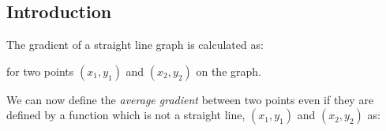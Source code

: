             \subsection{ Introduction}
            \nopagebreak
      \label{m39213*id189263}The gradient of a straight line graph is calculated as:\par 
      \label{m39213*uid1}\nopagebreak\noindent{}
      \label{m39213*id189656}for two points $\left({x}_{1},{y}_{1}\right)$ and $\left({x}_{2},{y}_{2}\right)$ on the graph.\par 
      \label{m39213*id189717}We can now define the \textsl{average gradient} between two points even if they are defined by a function which is not a straight line, $\left({x}_{1},{y}_{1}\right)$ and $\left({x}_{2},{y}_{2}\right)$ as:\par 
      \label{m39213*uid2}\nopagebreak\noindent{}
